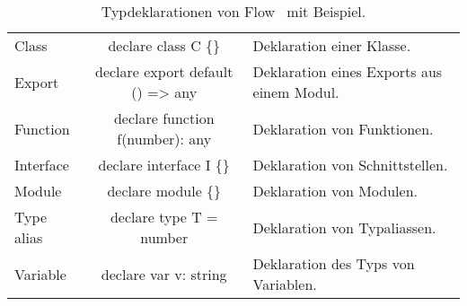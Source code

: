 \begin{table}[tbh]
  \footnotesize
  \begin{tabu} to 
    \midrule
     &  &  \\
    \midrule
    Class       & declare class C \{\}             & Deklaration einer Klasse. \\
    Export      & declare export default () => any & Deklaration eines Exports aus einem Modul. \\
    Function    & declare function f(number): any  & Deklaration von Funktionen. \\
    Interface   & declare interface I \{\}         & Deklaration von Schnittstellen. \\
    Module      & declare module  \{\}      & Deklaration von Modulen. \\
    Type alias  & declare type T = number          & Deklaration von Typaliassen. \\
    Variable    & declare var v: string            & Deklaration des Typs von Variablen. \\
    \midrule
  \end{tabu}
  \caption{Typdeklarationen von Flow~\autocite{FLOW:LIBRARY_DEFINITIONS} mit Beispiel.}
  \label{tab:flow-type-declarations}
\end{table}
